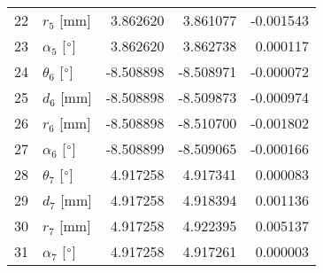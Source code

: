 \documentclass{standalone}%
\begin{document}
\begin{tabular}{llrrr}
22 &              $r_{5}$ [mm] &  3.862620 &   3.861077 &  -0.001543 \\
23 &  $\alpha_{5}$ [$\degree$] &  3.862620 &   3.862738 &   0.000117 \\
24 &  $\theta_{6}$ [$\degree$] & -8.508898 &  -8.508971 &  -0.000072 \\
25 &              $d_{6}$ [mm] & -8.508898 &  -8.509873 &  -0.000974 \\
26 &              $r_{6}$ [mm] & -8.508898 &  -8.510700 &  -0.001802 \\
27 &  $\alpha_{6}$ [$\degree$] & -8.508899 &  -8.509065 &  -0.000166 \\
28 &  $\theta_{7}$ [$\degree$] &  4.917258 &   4.917341 &   0.000083 \\
29 &              $d_{7}$ [mm] &  4.917258 &   4.918394 &   0.001136 \\
30 &              $r_{7}$ [mm] &  4.917258 &   4.922395 &   0.005137 \\
31 &  $\alpha_{7}$ [$\degree$] &  4.917258 &   4.917261 &   0.000003 \\
\bottomrule
\end{tabular}
%
\end{document}
